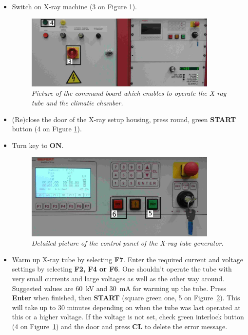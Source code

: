 \documentclass[a4paper,12pt,twoside]{article}
\begin{document}
\begin{itemize}
\item {Switch on X-ray machine (3 on Figure \ref{Commandboard}).
\begin{figure} [h!] \centering 
\includegraphics[width=0.9\textwidth, angle=0] {./Figures/Full2.jpg}
\caption{\em  \label{Commandboard}
Picture of the command board which enables to operate the X-ray tube and the climatic chamber.}
\end{figure}
}
\item {(Re)close the door of the X-ray setup housing, press round, green \textbf{START} button (4 on Figure \ref{Commandboard}).}
\item {Turn key to \textbf{ON}.
\begin{figure} [h!] \centering 
\includegraphics[width=0.9\textwidth, angle=0] {./Figures/CommandBoard2.jpg}
\caption{\em  \label{Xray}
Detailed picture of the control panel of the X-ray tube generator.}
\end{figure}
}
\item{Warm up X-ray tube by selecting \textbf{F7}. Enter the required current and voltage settings by selecting \textbf{F2, F4 or F6}. One shouldn't operate the tube with very small currents and large voltages as well as the other way around. Suggested values are \SI{60}{\kV} and \SI{30}{\mA} for warming up the tube. Press \textbf{Enter} when finished, then \textbf{START} (square green one, 5 on Figure~\ref{Xray}). This will take up to 30 minutes depending on when the tube was last operated at this or a higher voltage. If the voltage is not set, check green interlock button (4 on Figure~\ref{Commandboard}) and the door and press \textbf{CL} to delete the error message.}

\end{itemize}
\end{document}
